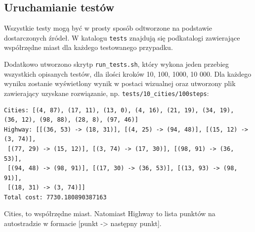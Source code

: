 \documentclass[a4paper]{article}
\begin{document}
\subsection{Uruchamianie testów}


Wszystkie testy mogą być w prosty sposób odtworzone na podstawie dostarczonych źródeł. W katalogu \texttt{tests} znajdują się podkatalogi zawierające współrzędne miast dla każdego testowanego przypadku. 

Dodatkowo utworzono skrytp \texttt{run\_tests.sh}, który wykona jeden przebieg wszystkich opisanych testów, dla ilości kroków 10, 100, 1000, 10 000. Dla każdego wyniku zostanie wyświetlony wynik w postaci wizualnej oraz utworzony plik zawierający uzyskane rozwiązanie, np. \texttt{tests/10\_cities/100steps}:
\begin{lstlisting}[basicstyle=\ttfamily\selectfont\footnotesize]
Cities: [(4, 87), (17, 11), (13, 0), (4, 16), (21, 19), (34, 19), 
(36, 12), (98, 88), (28, 8), (97, 46)]
Highway: [[(36, 53) -> (18, 31)], [(4, 25) -> (94, 48)], [(15, 12) -> (3, 74)],
 [(77, 29) -> (15, 12)], [(3, 74) -> (17, 30)], [(98, 91) -> (36, 53)], 
 [(94, 48) -> (98, 91)], [(17, 30) -> (36, 53)], [(13, 93) -> (98, 91)], 
 [(18, 31) -> (3, 74)]]
Total cost: 7730.180890387163
\end{lstlisting}

Cities, to współrzędne miast. Natomiast Highway to lista punktów na autostradzie w formacie [punkt -> następny punkt].
\end{document}
